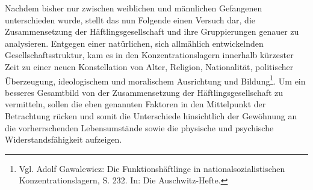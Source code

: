 \documentclass[a4paper,12pt,ngerman,
]{nisebook}
\begin{document}
Nachdem bisher nur zwischen weiblichen und männlichen Gefangenen unterschieden wurde, stellt das nun Folgende einen Versuch dar, die Zusammensetzung der Häftlingsgesellschaft und ihre Gruppierungen genauer zu analysieren. \newline
Entgegen einer natürlichen, sich allmählich entwickelnden Gesellschaftsstruktur, kam es in den Konzentrationslagern innerhalb kürzester Zeit zu einer neuen Konstellation von Alter, Religion, Nationalität, politischer Überzeugung, ideologischem und moralischem Ausrichtung und Bildung\footnote{Vgl. Adolf Gawalewicz: Die Funktionshäftlinge in nationalsozialistischen Konzentrationslagern, S. 232. In: Die Auschwitz-Hefte.}. Um ein besseres Gesamtbild von der Zusammensetzung der Häftlingsgesellschaft zu vermitteln, sollen die eben genannten Faktoren in den Mittelpunkt der Betrachtung rücken und somit die Unterschiede hinsichtlich der Gewöhnung an die vorherrschenden Lebensumstände sowie die physische und psychische Widerstandsfähigkeit aufzeigen.
\end{document}
